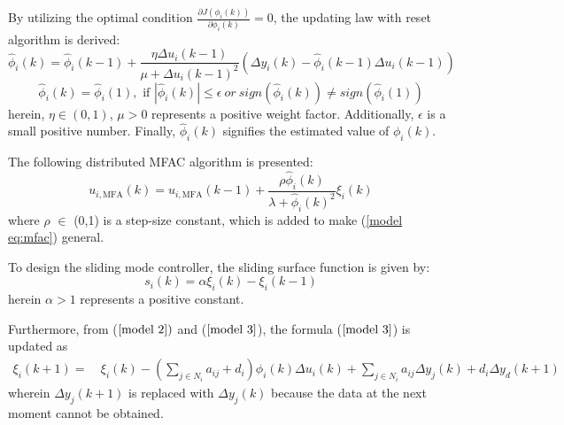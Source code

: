 \documentclass[journal,onecolumn]{IEEEtran}
\begin{document}
By utilizing the optimal condition $ \frac{\partial J(\phi_i(k))}{\partial \phi_i(k)}=0 $, the updating law with reset algorithm is derived:
\begin{equation}
    \label{model eq:ppd_parameter}
    \hat{\phi}_i(k) = \hat{\phi}_i(k-1) + \frac{\eta \Delta u_i(k-1) }{\mu + \Delta u_i(k-1)^2}(\Delta y_i(k) - \hat{\phi}_i(k-1) \Delta u_i(k-1))
\end{equation}
\begin{equation}
    \label{reset}
    \hat{\phi}_i(k) = \hat{\phi}_i(1),  \text{ if }  |\hat{\phi}_i(k) | \leq \epsilon \ or \ sign(\hat{\phi}_i(k)) \neq  sign(\hat{\phi}_i(1))
\end{equation}
herein, $\eta \in (0,1)$, $\mu > 0$ represents a positive weight factor. Additionally, $\epsilon$ is a small positive number. Finally, $\hat{\phi}_i(k)$ signifies the estimated value of $\phi_i(k)$.

The following distributed MFAC algorithm is presented:
\begin{equation}
    \label{model eq:mfac}
    u_{i,\text{MFA}}(k) = u_{i,\text{MFA}}(k - 1) + \frac{\rho \hat{\phi}_i(k)}{\lambda + \hat{\phi}_i(k)^2} \xi_i(k)
\end{equation}
where \(\rho\) \(\in\) (0,1) is a step-size constant, which is added to make (\ref{model eq:mfac}) general. 

To design the sliding mode controller, the sliding surface function is given by:
\begin{equation}
    \label{model eq:sms}
    s_i(k) = \alpha \xi_i(k) - \xi_i(k-1)
\end{equation}
herein $ \alpha > 1$ represents a positive constant.

Furthermore, from ($ \ref{model 2}) $ and ($ \ref{model 3} $), the formula ($ \ref{model 3} $) is updated as
\begin{align}
    \label{model eq:xi_next}
    \xi_i(k+1) =\ & \xi_i(k) - (\sum_{j \in N_i} a_{ij} + d_i ) \phi_i(k) \Delta u_i(k) + \sum_{j \in N_i} a_{ij} \Delta y_j(k) + d_i \Delta y_d(k+1)
\end{align}
wherein $\Delta y_j(k+1)$ is replaced with $ \Delta y_j(k) $ because the data at the next moment cannot be obtained.


\end{document}
